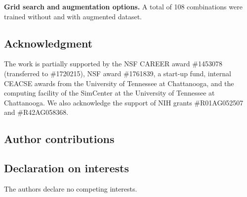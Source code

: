 \documentclass[conference]{IEEEtran}
\begin{document}
\label{S1_Table}
{\bf Grid search and augmentation options.} A total of 108 combinations were trained without and with augmented dataset. 


\subsection*{Acknowledgment}

The work is partially supported by the NSF CAREER award \#1453078 (transferred to \#1720215), NSF award \#1761839, a  start-up fund, internal CEACSE awards from the University of Tennessee at Chattanooga, and the computing facility of the SimCenter at the University of Tennessee at Chattanooga. We also acknowledge the support of NIH grants \#R01AG052507 and \#R42AG058368.


\subsection*{Author contributions}


\subsection*{Declaration on interests}

The authors declare no competing interests.  
\end{document}
